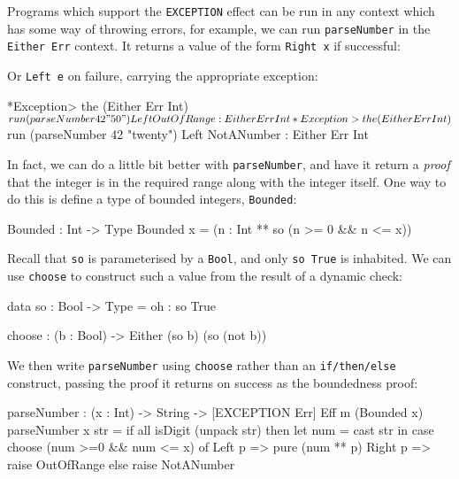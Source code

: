 \noindent
Programs which support the \texttt{EXCEPTION} effect can be run in any
context which has some way of throwing errors, for example, we can run
\texttt{parseNumber} in the \texttt{Either Err} context. It returns
a value of the form \texttt{Right x} if successful:


\noindent
Or \texttt{Left e} on failure, carrying the appropriate exception:

\begin{code}
*Exception> the (Either Err Int) $ run (parseNumber 42 "50")
Left OutOfRange : Either Err Int

*Exception> the (Either Err Int) $ run (parseNumber 42 "twenty")
Left NotANumber : Either Err Int
\end{code}

\noindent
In fact, we can do a little bit better with \texttt{parseNumber}, and have it
return a \emph{proof} that the integer is in the required range along with
the integer itself. One way to do this is define a type of bounded integers,
\texttt{Bounded}:

\begin{code}
Bounded : Int -> Type
Bounded x = (n : Int ** so (n >= 0 && n <= x))
\end{code}

\noindent
Recall that \texttt{so} is parameterised by a \texttt{Bool}, and only
\texttt{so True} is inhabited. We can use \texttt{choose} to construct such
a value from the result of a dynamic check:

\begin{code}
data so : Bool -> Type = oh : so True

choose : (b : Bool) -> Either (so b) (so (not b))
\end{code}

\noindent
We then write \texttt{parseNumber} using \texttt{choose} rather than
an \texttt{if/then/else} construct, passing the proof it returns on success
as the boundedness proof:

\begin{code}
parseNumber : (x : Int) -> String -> { [EXCEPTION Err] } Eff m (Bounded x)
parseNumber x str
   = if all isDigit (unpack str)
        then let num = cast str in
             case choose (num >=0 && num <= x) of
                  Left p => pure (num ** p)
                  Right p => raise OutOfRange
        else raise NotANumber
\end{code}

